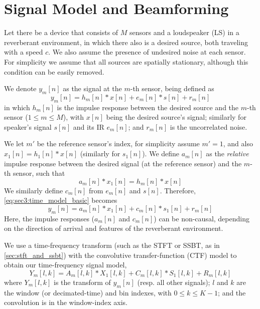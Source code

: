 \section{Signal Model and Beamforming}
\label{sec:signal_model}

Let there be a device that consists of $M$ sensors and a loudspeaker (LS) in a reverberant environment, in which there also is a desired source, both traveling with a speed $c$. We also assume the presence of undesired noise at each sensor. For simplicity we assume that all sources are spatially stationary, although this condition can be easily removed.

We denote $y_m[n]$ as the signal at the $m$-th sensor, being defined as
\begin{equation}
	\label{eq:sec3:time_model_basic}
	y_m[n] = h_m[n] \ast x[n] + e_m[n] \ast s[n] + r_m[n]
\end{equation}
in which $h_m[n]$ is the impulse response between the desired source and the $m$-th sensor ($1 \leq m \leq M$), with $x[n]$ being the desired source's signal; similarly for  speaker's signal $s[n]$ and its IR $e_m[n]$; and $r_m[n]$ is the uncorrelated noise.

We let $m'$ be the reference sensor's index, for simplicity assume $m' = 1$, and also $x_1[n] = h_1[n] \ast x[n]$ (similarly for $s_1[n]$). We define $a_m[n]$ as the \textit{relative} impulse response between the desired signal (at the reference sensor) and the $m$-th sensor, such that
\begin{equation}
	a_m[n] \ast x_1[n] = h_m[n] \ast x[n]
\end{equation}
We similarly define $c_m[n]$ from $e_m[n]$ and $s[n]$. Therefore, \cref{eq:sec3:time_model_basic} becomes
\begin{equation}
	\label{eq:sec3:time_model_relative}
	y_m[n] = a_m[n] \ast x_1[n] + c_m[n] \ast s_1[n] + r_m[n]
\end{equation}
Here, the impulse responses ($a_m[n]$ and $c_m[n]$) can be non-causal, depending on the direction of arrival and features of the reverberant environment.

We use a time-frequency transform (such as the STFT or SSBT, as in \cref{sec:stft_and_ssbt}) with the convolutive transfer-function (CTF) model \cite{talmon_relative_2009} to obtain our time-frequency signal model,
\begin{equation}
	\label{eq:sec3:time-freq_model_conv}
	Y_m[l,k] = A_m[l,k] \ast X_1[l,k] + C_m[l,k] \ast S_1[l,k] + R_m[l,k]
\end{equation}
where $Y_m[l,k]$ is the transform of $y_m[n]$ (resp. all other signals); $l$ and $k$ are the window (or decimated-time) and bin indexes, with $0 \leq k \leq K-1$; and the convolution is in the window-index axis.

